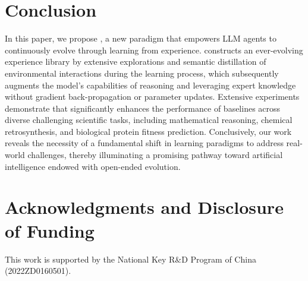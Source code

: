 \section{Conclusion}
In this paper, we propose \method{}, a new paradigm that empowers LLM agents to continuously evolve through learning from experience.
\method{} constructs an ever-evolving experience library by extensive explorations and semantic distillation of environmental interactions during the learning process, which subsequently augments the model's capabilities of reasoning and leveraging expert knowledge without gradient back-propagation or parameter updates.
Extensive experiments demonstrate that \method{} significantly enhances the performance of baselines across diverse challenging scientific tasks, including mathematical reasoning, chemical retrosynthesis, and biological protein fitness prediction.
Conclusively, our work reveals the necessity of a fundamental shift in learning paradigms to address real-world challenges, thereby illuminating a promising pathway toward artificial intelligence endowed with open-ended evolution.

\section*{Acknowledgments and Disclosure of Funding}
This work is supported by the National Key R\&D Program of China (2022ZD0160501).